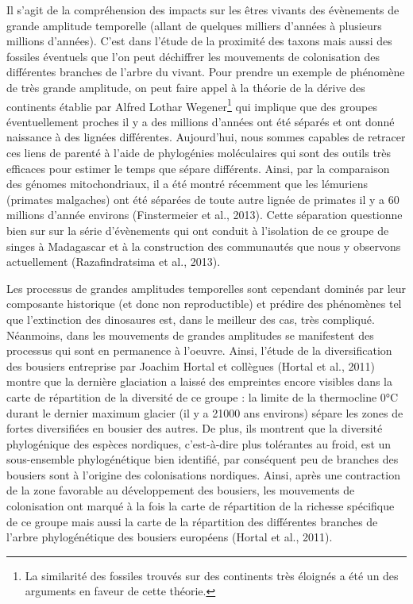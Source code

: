 Il s'agit de la compréhension des impacts sur les êtres vivants des
évènements de grande amplitude temporelle (allant de quelques milliers
d'années à plusieurs millions d'années). C'est dans l'étude de la
proximité des taxons mais aussi des fossiles éventuels que l'on peut
déchiffrer les mouvements de colonisation des différentes branches de
l'arbre du vivant. Pour prendre un exemple de phénomène de très grande
amplitude, on peut faire appel à la théorie de la dérive des continents
établie par Alfred Lothar Wegener\footnote{La similarité des fossiles
  trouvés sur des continents très éloignés a été un des arguments en
  faveur de cette théorie.} qui implique que des groupes éventuellement
proches il y a des millions d'années ont été séparés et ont donné
naissance à des lignées différentes. Aujourd'hui, nous sommes capables
de retracer ces liens de parenté à l'aide de phylogénies moléculaires
qui sont des outils très efficaces pour estimer le temps que sépare
différents. Ainsi, par la comparaison des génomes mitochondriaux, il a
été montré récemment que les lémuriens (primates malgaches) ont été
séparées de toute autre lignée de primates il y a 60 millions d'année
environs (Finstermeier et al., 2013). Cette séparation questionne bien
sur sur la série d'évènements qui ont conduit à l'isolation de ce groupe
de singes à Madagascar et à la construction des communautés que nous y
observons actuellement (Razafindratsima et al., 2013).

Les processus de grandes amplitudes temporelles sont cependant dominés
par leur composante historique (et donc non reproductible) et prédire
des phénomènes tel que l'extinction des dinosaures est, dans le meilleur
des cas, très compliqué. Néanmoins, dans les mouvements de grandes
amplitudes se manifestent des processus qui sont en permanence à
l'oeuvre. Ainsi, l'étude de la diversification des bousiers entreprise
par Joachim Hortal et collègues (Hortal et al., 2011) montre que la
dernière glaciation a laissé des empreintes encore visibles dans la
carte de répartition de la diversité de ce groupe : la limite de la
thermocline 0°C durant le dernier maximum glacier (il y a 21000 ans
environs) sépare les zones de fortes diversifiées en bousier des autres.
De plus, ils montrent que la diversité phylogénique des espèces
nordiques, c'est-à-dire plus tolérantes au froid, est un sous-ensemble
phylogénétique bien identifié, par conséquent peu de branches des
bousiers sont à l'origine des colonisations nordiques. Ainsi, après une
contraction de la zone favorable au développement des bousiers, les
mouvements de colonisation ont marqué à la fois la carte de répartition
de la richesse spécifique de ce groupe mais aussi la carte de la
répartition des différentes branches de l'arbre phylogénétique des
bousiers européens (Hortal et al., 2011).

